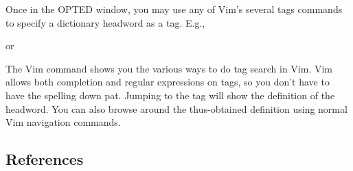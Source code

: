Once in the OPTED window, you may use any of Vim's
several tags commands to specify a dictionary headword
as a tag.  E.g.,

or


The Vim command  shows you the various
ways to do tag search in Vim.  Vim allows both
completion and regular expressions on tags, so you don't have to
have the spelling down pat.  Jumping to the tag
will show the definition of the headword.  You can also
browse around the thus-obtained definition using normal
Vim navigation commands.

\subsection*{References}




\bye

